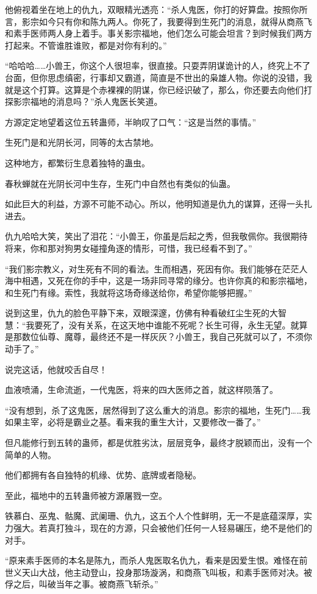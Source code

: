 \begin{this_body}
他俯视着坐在地上的仇九，双眼精光透亮：“杀人鬼医，你打的好算盘。按照你所言，影宗如今只有你和陈九两人。你死了，我要得到生死门的消息，就得从商燕飞和素手医师两人身上着手。事关影宗福地，他们怎么可能会坦言？到时候我们两方打起来。不管谁胜谁败，都是对你有利的。”

“哈哈哈……小兽王，你这个人很坦率，很直接。只耍弄阴谋诡计的人，终究上不了台面，但你思虑缜密，行事却又霸道，简直是不世出的枭雄人物。你说的没错，我就是这个打算。这算是个赤裸裸的阴谋，你已经识破了，那么，你还要去向他们打探影宗福地的消息吗？”杀人鬼医长笑道。

方源定定地望着这位五转蛊师，半晌叹了口气：“这是当然的事情。”

生死门是和光阴长河，同等的太古禁地。

这种地方，都繁衍生息着独特的蛊虫。

春秋蝉就在光阴长河中生存，生死门中自然也有类似的仙蛊。

如此巨大的利益，方源不可能不动心。所以，他明知道是仇九的谋算，还得一头扎进去。

仇九哈哈大笑，笑出了泪花：“小兽王，你虽是后起之秀，但我敬佩你。我很期待将来，你和那对狗男女碰撞角逐的情形，可惜，我已经看不到了。”

“我们影宗教义，对生死有不同的看法。生而相遇，死因有你。我们能够在茫茫人海中相遇，又死在你的手中，这是一场非同寻常的缘分。也许你真的和影宗福地，和生死门有缘。索性，我就将这场奇缘送给你，希望你能够把握。”

说到这里，仇九的脸色平静下来，双眼深邃，仿佛有种看破红尘生死的大智慧：“我要死了，没有关系，在这天地中谁能不死呢？长生可得，永生无望。就算是那数位仙尊、魔尊，最终还不是一样灰灰？小兽王，我自己死就可以了，不须你动手了。”

说完这话，他就咬舌自尽！

血液喷涌，生命流逝，一代鬼医，将来的四大医师之首，就这样陨落了。

“没有想到，杀了这鬼医，居然得到了这么重大的消息。影宗的福地，生死门……我如果主宰，必将是霸业之基。看来我的重生大计，又要修改一番了。”

但凡能修行到五转的蛊师，都是优胜劣汰，层层竞争，最终才脱颖而出，没有一个简单的人物。

他们都拥有各自独特的机缘、优势、底牌或者隐秘。

至此，福地中的五转蛊师被方源屠戮一空。

铁慕白、巫鬼、骷魔、武阑珊、仇九，这五个人个性鲜明，无一不是底蕴深厚，实力强大。若真打独斗，现在的方源，只会被他们任何一人轻易碾压，绝不是他们的对手。

“原来素手医师的本名是陈九，而杀人鬼医取名仇九，看来是因爱生恨。难怪在前世义天山大战，他主动登山，投身那场漩涡，和商燕飞叫板，和素手医师对决。被俘之后，叫破当年之事。被商燕飞斩杀。”


\end{this_body}
